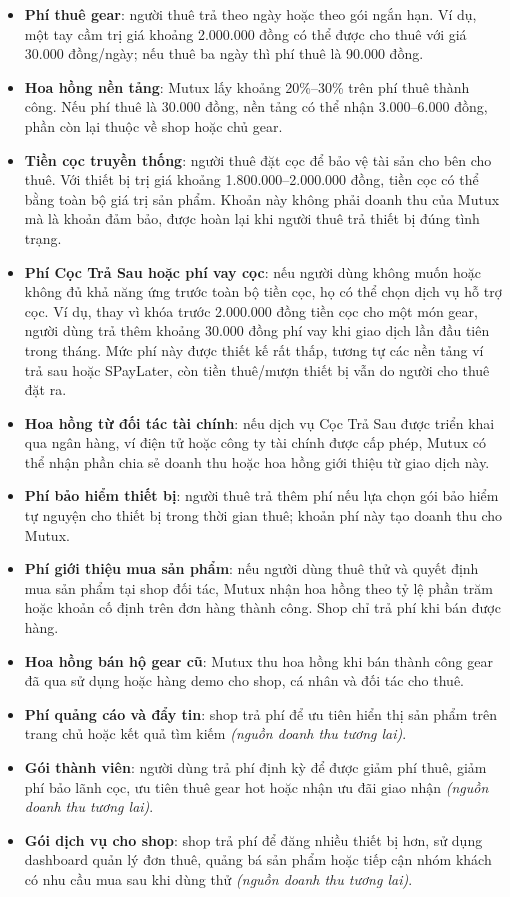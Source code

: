 \begin{itemize}
    \item \textbf{Phí thuê gear}: người thuê trả theo ngày hoặc theo gói ngắn hạn. Ví dụ, một tay cầm trị giá khoảng 2.000.000 đồng có thể được cho thuê với giá 30.000 đồng/ngày; nếu thuê ba ngày thì phí thuê là 90.000 đồng.
    \item \textbf{Hoa hồng nền tảng}: Mutux lấy khoảng 20\%--30\% trên phí thuê thành công. Nếu phí thuê là 30.000 đồng, nền tảng có thể nhận 3.000--6.000 đồng, phần còn lại thuộc về shop hoặc chủ gear.
    \item \textbf{Tiền cọc truyền thống}: người thuê đặt cọc để bảo vệ tài sản cho bên cho thuê. Với thiết bị trị giá khoảng 1.800.000--2.000.000 đồng, tiền cọc có thể bằng toàn bộ giá trị sản phẩm. Khoản này không phải doanh thu của Mutux mà là khoản đảm bảo, được hoàn lại khi người thuê trả thiết bị đúng tình trạng.
    \item \textbf{Phí Cọc Trả Sau hoặc phí vay cọc}: nếu người dùng không muốn hoặc không đủ khả năng ứng trước toàn bộ tiền cọc, họ có thể chọn dịch vụ hỗ trợ cọc. Ví dụ, thay vì khóa trước 2.000.000 đồng tiền cọc cho một món gear, người dùng trả thêm khoảng 30.000 đồng phí vay khi giao dịch lần đầu tiên trong tháng. Mức phí này được thiết kế rất thấp, tương tự các nền tảng ví trả sau hoặc SPayLater, còn tiền thuê/mượn thiết bị vẫn do người cho thuê đặt ra.
    \item \textbf{Hoa hồng từ đối tác tài chính}: nếu dịch vụ Cọc Trả Sau được triển khai qua ngân hàng, ví điện tử hoặc công ty tài chính được cấp phép, Mutux có thể nhận phần chia sẻ doanh thu hoặc hoa hồng giới thiệu từ giao dịch này.
    \item \textbf{Phí bảo hiểm thiết bị}: người thuê trả thêm phí nếu lựa chọn gói bảo hiểm tự nguyện cho thiết bị trong thời gian thuê; khoản phí này tạo doanh thu cho Mutux.
    \item \textbf{Phí giới thiệu mua sản phẩm}: nếu người dùng thuê thử và quyết định mua sản phẩm tại shop đối tác, Mutux nhận hoa hồng theo tỷ lệ phần trăm hoặc khoản cố định trên đơn hàng thành công. Shop chỉ trả phí khi bán được hàng.
    \item \textbf{Hoa hồng bán hộ gear cũ}: Mutux thu hoa hồng khi bán thành công gear đã qua sử dụng hoặc hàng demo cho shop, cá nhân và đối tác cho thuê.
    \item \textbf{Phí quảng cáo và đẩy tin}: shop trả phí để ưu tiên hiển thị sản phẩm trên trang chủ hoặc kết quả tìm kiếm \textit{(nguồn doanh thu tương lai)}.
    \item \textbf{Gói thành viên}: người dùng trả phí định kỳ để được giảm phí thuê, giảm phí bảo lãnh cọc, ưu tiên thuê gear hot hoặc nhận ưu đãi giao nhận \textit{(nguồn doanh thu tương lai)}.
    \item \textbf{Gói dịch vụ cho shop}: shop trả phí để đăng nhiều thiết bị hơn, sử dụng dashboard quản lý đơn thuê, quảng bá sản phẩm hoặc tiếp cận nhóm khách có nhu cầu mua sau khi dùng thử \textit{(nguồn doanh thu tương lai)}.
\end{itemize}

